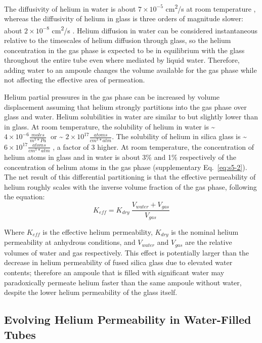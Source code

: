 The diffusivity of helium in water is about \(7 \times 10^{-5}\) cm\textsuperscript{2}/s at room temperature \citep{verhallen1984}, whereas the diffusivity of helium in glass is three orders of magnitude slower: about \(2 \times 10^{-8}\) cm\textsuperscript{2}/s \citep{swets1961}. Helium diffusion in water can be considered instantaneous relative to the timescales of helium diffusion through glass, so the helium concentration in the gas phase is expected to be in equilibrium with the glass throughout the entire tube even where mediated by liquid water. Therefore, adding water to an ampoule changes the volume available for the gas phase while not affecting the effective area of permeation.

Helium partial pressures in the gas phase can be increased by volume displacement assuming that helium strongly partitions into the gas phase over glass and water. Helium solubilities in water are similar to but slightly lower than in glass. At room temperature, the solubility of helium in water is \textasciitilde{} \(4 \times 10^{- 6}\frac{moles}{m^{3}*Pa}\ \)\citep{sander2015} or \textasciitilde{} \(2 \times 10^{17}\frac{atoms}{{cm}^{3}*atm}\). The solubility of helium in silica glass is \textasciitilde{} \(6 \times 10^{17}\frac{atoms}{{cm}^{3}*atm}\) \citep{swets1961}, a factor of 3 higher. At room temperature, the concentration of helium atoms in glass and in water is about 3\% and 1\% respectively of the concentration of helium atoms in the gas phase (supplementary Eq.~\eqref{eq:s5-2}). The net result of this differential partitioning is that the effective permeability of helium roughly scales with the inverse volume fraction of the gas phase, following the equation: \begin{equation}
\label{eq:keff}
K_{eff} = K_{dry}\ \frac{V_{water} + V_{gas}}{V_{gas}}
\end{equation}

Where \(K_{eff}\) is the effective helium permeability, \(K_{dry}\) is the nominal helium permeability at anhydrous conditions, and \(V_{water}\) and \(V_{gas}\) are the relative volumes of water and gas respectively. This effect is potentially larger than the decrease in helium permeability of fused silica glass due to elevated water contents; therefore an ampoule that is filled with significant water may paradoxically permeate helium faster than the same ampoule without water, despite the lower helium permeability of the glass itself.

\subsection{Evolving Helium Permeability in Water-Filled Tubes}\label{evolving-helium-permeability-in-water-filled-tubes}

